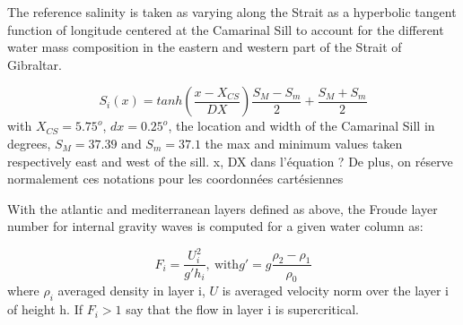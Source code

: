 The reference salinity is taken as varying along the Strait as a hyperbolic tangent function of longitude centered at the Camarinal Sill to account for the different water mass composition in the eastern and western part of the Strait of Gibraltar. 

\begin{equation}
	S_i(x)=tanh(\frac{x-X_{CS}}{DX})\frac{S_M-S_m}{2}+\frac{S_M+S_m}{2}
\end{equation}
with $X_{CS}=5.75^o$, $dx=0.25^o$, the location and width of the Camarinal Sill in degrees, $S_M=37.39$ and $S_m=37.1$ the max and minimum values taken respectively east and west of the sill.
\color{green}x, DX dans l'équation ? De plus, on réserve normalement ces notations pour les coordonnées cartésiennes \color{black}



With the atlantic and mediterranean layers defined as above, the Froude layer number for internal gravity waves is computed for \color{blue} a given water column as\color{black}: 

\begin{equation}
F_i=\frac{U_i^2}{g'h_i} , \ \text{with} g'=g \frac{\rho_2-\rho_1}{\rho_0}
\end{equation}
where $\rho_i$ averaged density in layer i,  $U$ is averaged velocity norm over the layer i of height h. If $F_i>1$ say that the flow in layer i is supercritical.


